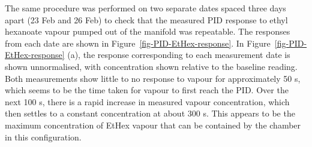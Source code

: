 \documentclass[
  a4paper,
]{scrbook}
\begin{document}
The same procedure was performed on two separate dates spaced three days
apart (23 Feb and 26 Feb) to check that the measured PID response to
ethyl hexanoate vapour pumped out of the manifold was repeatable. The
responses from each date are shown in
Figure~\ref{fig-PID-EtHex-response}. In
Figure~\ref{fig-PID-EtHex-response} (a), the response corresponding to
each measurement date is shown unnormalised, with concentration shown
relative to the baseline reading. Both measurements show little to no
response to vapour for approximately 50 s, which seems to be the time
taken for vapour to first reach the PID. Over the next 100 s, there is a
rapid increase in measured vapour concentration, which then settles to a
constant concentration at about 300 s. This appears to be the maximum
concentration of EtHex vapour that can be contained by the chamber in
this configuration.
\end{document}
